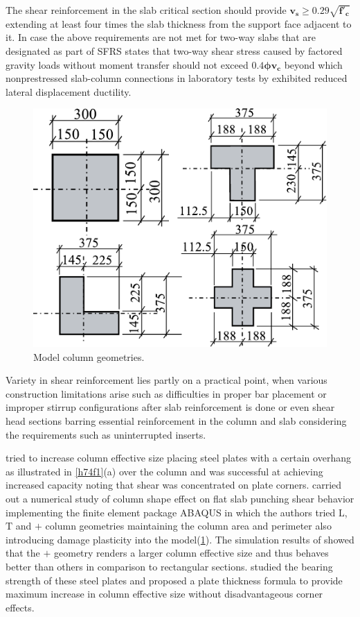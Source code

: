 \documentclass[twocolumn]{article} %
\begin{document}
The shear reinforcement in the slab critical section should provide $\mathbf{v_s\ge0.29\sqrt{f'_c}}$ extending at least four times the slab thickness from the support face adjacent to it. In case the above requirements are not met for two-way slabs that are designated as part of SFRS \citet[Section 18.4.5.8]{aci31819} states that two-way shear stress caused by factored gravity loads without moment transfer should not exceed $\mathbf{0.4\phi v_c}$ beyond which nonprestressed slab-column connections in laboratory tests by \cite{pan1989} exhibited reduced lateral displacement ductility. 
\begin{figure}\centering
    \includegraphics[width=\columnwidth]{Figures/akt1.pdf}\caption{Model column geometries\citep{akinpelu2023}.}\label{akt1}
    \end{figure}

Variety in shear reinforcement lies partly on a practical point, when various construction limitations arise such as difficulties in proper bar placement or improper stirrup configurations after slab reinforcement is done or even shear head sections barring essential reinforcement in the column and slab considering the \cite{ACI31814} requirements such as uninterrupted inserts.

\cite{moe1961} tried to increase column effective size placing steel plates with a certain overhang as illustrated in \ref{h74f1}(a) over the column and was successful at achieving increased capacity noting that shear was concentrated on plate corners. \cite{akinpelu2023} carried out a numerical study of column shape effect on flat slab punching shear behavior implementing the finite element package ABAQUS\citep{abaqus} in which the authors tried $\mathrm{L}$, $\mathrm{T}$ and $\mathrm{+}$ column geometries maintaining the column area and perimeter also introducing damage plasticity into the model(\ref{akt1}). The simulation results of \cite{akinpelu2023} showed that  the $\mathrm{+}$ geometry renders a larger column effective size and thus behaves better than others in comparison to rectangular sections\citep{akinpelu2023}. \cite{hawkins1968} studied the bearing strength of these steel plates and proposed a plate thickness formula to provide maximum increase in column effective size without disadvantageous corner effects.
\end{document}
